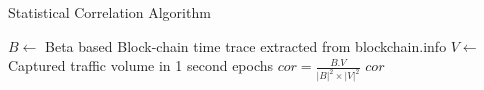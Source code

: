 \begin{algorithm}
\caption{Statistical Correlation Algorithm}
\label{algo:stat_scheme}
\begin{algorithmic}[1]
\State $B \gets $ Beta based Block-chain time trace extracted from blockchain.info 
\State $V \gets $ Captured traffic volume in 1 second epochs
\State $cor = \frac{B . V}{|B|^2 \times |V|^2}$
\State \Return $cor$
\EndProcedure
\end{algorithmic}
\end{algorithm}

